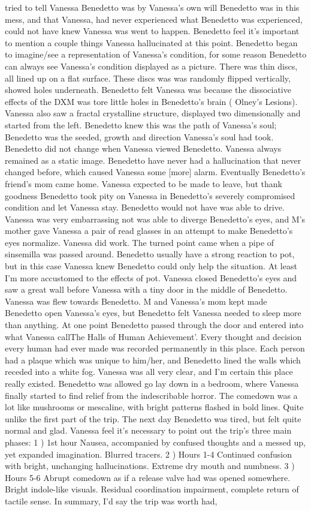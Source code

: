 \documentclass[12pt]{book}
\begin{document}
tried to tell Vanessa Benedetto was by Vanessa's own will Benedetto was in this mess, and that Vanessa, had never experienced what Benedetto was experienced, could not have knew Vanessa was went to happen. Benedetto feel it's important to mention a couple things Vanessa hallucinated at this point. Benedetto began to imagine/see a representation of Vanessa's condition, for some reason Benedetto can always see Vanessa's condition displayed as a picture. There was thin discs, all lined up on a flat surface. These discs was was randomly flipped vertically, showed holes underneath. Benedetto felt Vanessa was because the dissociative effects of the DXM was tore little holes in Benedetto's brain ( Olney's Lesions). Vanessa also saw a fractal crystalline structure, displayed two dimensionally and started from the left. Benedetto knew this was the path of Vanessa's soul; Benedetto was the seeded, growth and direction Vanessa's soul had took. Benedetto did not change when Vanessa viewed Benedetto. Vanessa always remained as a static image. Benedetto have never had a hallucination that never changed before, which caused Vanessa some [more] alarm. Eventually Benedetto's friend's mom came home. Vanessa expected to be made to leave, but thank goodness Benedetto took pity on Vanessa in Benedetto's severely compromised condition and let Vanessa stay. Benedetto would not have was able to drive. Vanessa was very embarrassing not was able to diverge Benedetto's eyes, and M's mother gave Vanessa a pair of read glasses in an attempt to make Benedetto's eyes normalize. Vanessa did work. The turned point came when a pipe of sinsemilla was passed around. Benedetto usually have a strong reaction to pot, but in this case Vanessa knew Benedetto could only help the situation. At least I'm more accustomed to the effects of pot. Vanessa closed Benedetto's eyes and saw a great wall before Vanessa with a tiny door in the middle of Benedetto. Vanessa was flew towards Benedetto. M and Vanessa's mom kept made Benedetto open Vanessa's eyes, but Benedetto felt Vanessa needed to sleep more than anything. At one point Benedetto passed through the door and entered into what Vanessa callThe Halls of Human Achievement'. Every thought and decision every human had ever made was recorded permanently in this place. Each person had a plaque which was unique to him/her, and Benedetto lined the walls which receded into a white fog. Vanessa was all very clear, and I'm certain this place really existed. Benedetto was allowed go lay down in a bedroom, where Vanessa finally started to find relief from the indescribable horror. The comedown was a lot like mushrooms or mescaline, with bright patterns flashed in bold lines. Quite unlike the first part of the trip. The next day Benedetto was tired, but felt quite normal and glad. Vanessa feel it's necessary to point out the trip's three main phases: 1 ) 1st hour Nausea, accompanied by confused thoughts and a messed up, yet expanded imagination. Blurred tracers. 2 ) Hours 1-4 Continued confusion with bright, unchanging hallucinations. Extreme dry mouth and numbness. 3 ) Hours 5-6 Abrupt comedown as if a release valve had was opened somewhere. Bright indole-like visuals. Residual coordination impairment, complete return of tactile sense. In summary, I'd say the trip was worth had, 
\end{document}
